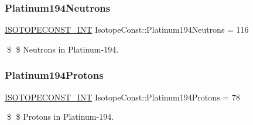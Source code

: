 \subsubsection{\texorpdfstring{Platinum194\+Neutrons}{Platinum194Neutrons}}
{\footnotesize\ttfamily \mbox{\hyperlink{group___isotope_const-_macros_ga5f18360b3e99483a35c32d789e62621c}{I\+S\+O\+T\+O\+P\+E\+C\+O\+N\+S\+T\+\_\+\+I\+NT}} Isotope\+Const\+::\+Platinum194\+Neutrons = 116}

\$ \$ Neutrons in Platinum-\/194. \mbox{\label{group___isotope_const-_platinum-_pt194_ga60c24ef9180f4c23b8a481f3376c14ed}} 
\subsubsection{\texorpdfstring{Platinum194\+Protons}{Platinum194Protons}}
{\footnotesize\ttfamily \mbox{\hyperlink{group___isotope_const-_macros_ga5f18360b3e99483a35c32d789e62621c}{I\+S\+O\+T\+O\+P\+E\+C\+O\+N\+S\+T\+\_\+\+I\+NT}} Isotope\+Const\+::\+Platinum194\+Protons = 78}

\$ \$ Protons in Platinum-\/194. 